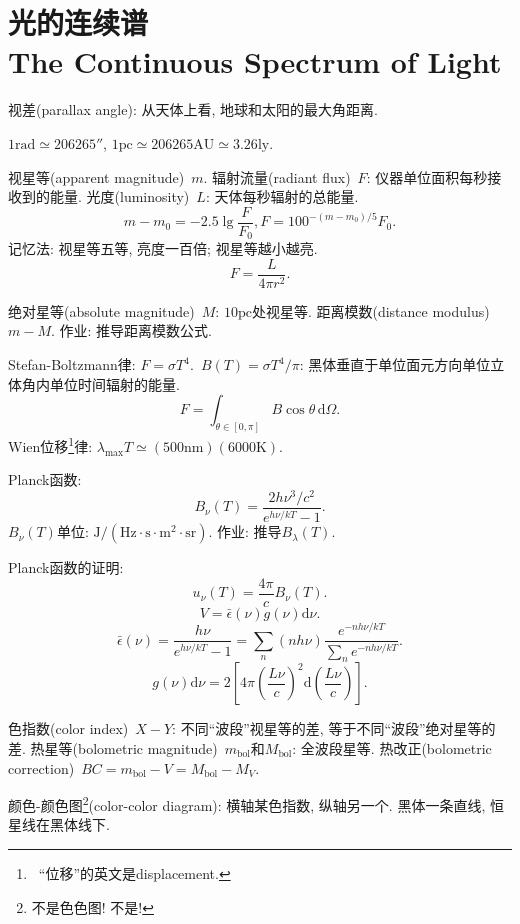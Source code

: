 \chapter{光的连续谱\\The Continuous Spectrum of Light}

视差(parallax angle): 从天体上看, 地球和太阳的最大角距离.

$1\text{rad}\simeq 206265''$, $1\text{pc}\simeq 206265\text{AU}\simeq 3.26\text{ly}$.

视星等(apparent magnitude)~$m$. 辐射流量(radiant flux)~$F$: 仪器单位面积每秒接收到的能量. 光度(luminosity)~$L$: 天体每秒辐射的总能量.
\begin{equation*}
    m-m_0 = -2.5\lg \frac{F}{F_0}, F=100^{-(m-m_0)/5}F_0.
\end{equation*}
记忆法: 视星等五等, 亮度一百倍; 视星等越小越亮.
\begin{equation*}
    F = \frac{L}{4\pi r^2}.
\end{equation*}

绝对星等(absolute magnitude)~$M$: $10\text{pc}$处视星等. 距离模数(distance modulus)~$m-M$. 作业: 推导距离模数公式.

Stefan-Boltzmann律: $F=\sigma T^4$.~$B(T)=\sigma T^4/\pi$: 黑体垂直于单位面元方向单位立体角内单位时间辐射的能量.
\begin{equation*}
    F = \int_{\theta\in[0,\pi]}B\cos\theta\,\mathrm{d}\Omega.
\end{equation*}
Wien位移\footnote{~``位移''的英文是displacement.}律: $\lambda_\text{max}T\simeq(500\text{nm})(6000\text{K})$.

Planck函数: 
\begin{equation*}
    B_\nu(T)=\frac{2h\nu^3/c^2}{e^{h\nu/kT}-1}.
\end{equation*}
$B_\nu(T)$单位: $\text{J}/(\text{Hz}\cdot\text{s}\cdot\text{m}^2\cdot\text{sr})$. 作业: 推导$B_\lambda(T)$.

Planck函数的证明:
\begin{equation*}
    u_\nu(T)=\frac{4\pi}{c}B_\nu(T).
\end{equation*}
\begin{equation*}
    [u_\nu(T)\mathrm{d}\nu]V=\bar{\epsilon}(\nu)g(\nu)\mathrm{d}\nu.
\end{equation*}
\begin{equation*}
    \bar{\epsilon}(\nu)=\frac{h\nu}{e^{h\nu/kT}-1}=\sum_n (nh\nu)\frac{e^{-nh\nu/kT}}{\sum_n e^{-nh\nu/kT}}.
\end{equation*}
\begin{equation*}
    g(\nu)\mathrm{d}\nu=2\left[4\pi\left(\frac{L\nu}{c}\right)^2\mathrm{d}\left(\frac{L\nu}{c}\right)\right].
\end{equation*}

色指数(color index)~$X-Y$: 不同``波段''视星等的差, 等于不同``波段''绝对星等的差. 热星等(bolometric magnitude)~$m_\text{bol}$和$M_\text{bol}$: 全波段星等. 热改正(bolometric correction)~$BC=m_\text{bol}-V=M_\text{bol}-M_V$.

颜色-颜色图\footnote{不是色色图! 不是!}(color-color diagram): 横轴某色指数, 纵轴另一个. 黑体一条直线, 恒星线在黑体线下.
